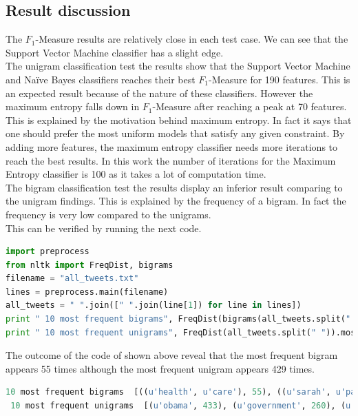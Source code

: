 \subsection{Result discussion}
The $F_1$-Measure results are relatively close in each test case. We can see that the Support Vector Machine classifier has a slight edge.\\
The unigram classification test the results show that the Support Vector Machine and Naïve Bayes classifiers reaches their best $F_1$-Measure for 190 features. This is an expected result because of the nature of these classifiers. However the maximum entropy falls down in $F_1$-Measure after reaching a peak at 70 features. This is explained by the motivation behind maximum entropy. In fact it says that one should prefer the most uniform models that satisfy any given constraint. By adding more features, the maximum entropy classifier needs more iterations to reach the best results. In this work the number of iterations for the Maximum Entropy classifier is 100 as it takes a lot of computation time.\\
The bigram classification test the results display an inferior result comparing to the unigram findings. This is explained by the frequency of a bigram. In fact the frequency  is very low compared to the unigrams.\\
This can be verified by running the next code.
\begin{lstlisting}[language=Python]
import preprocess
from nltk import FreqDist, bigrams
filename = "all_tweets.txt"
lines = preprocess.main(filename) 
all_tweets = " ".join([" ".join(line[1]) for line in lines])
print " 10 most frequent bigrams", FreqDist(bigrams(all_tweets.split(" "))).most_common(10)
print " 10 most frequent unigrams", FreqDist(all_tweets.split(" ")).most_common(10)
\end{lstlisting}
The outcome of the code of shown above reveal that the most frequent bigram appears 55 times although the most frequent unigram appears 429 times.
\begin{lstlisting}[language=Python]
10 most frequent bigrams  [((u'health', u'care'), 55), ((u'sarah', u'palin'), 37), ((u'president', u'obama'), 28), ((u'barack', u'obama'), 22), ((u'white', u'house'), 16), ((u'care', u'reform'), 16), ((u'bill', u'clinton'), 16), ((u'#tcot', u'#tlot'), 16), ((u'pres', u'obama'), 13), ((u'blog', u'post'), 13)]
 10 most frequent unigrams  [(u'obama', 433), (u'government', 260), (u'economy', 177), (u'afghanistan', 126), (u'2', 120), (u'good', 117), (u'senate', 115), (u'#tcot', 114), (u'congress', 110), (u'lol', 104)]
\end{lstlisting}

